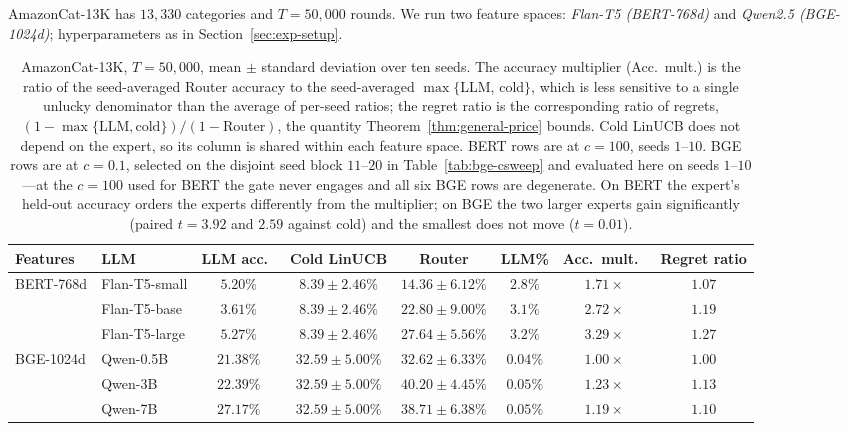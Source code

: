 \documentclass{article}
\theoremstyle{definition}
\theoremstyle{remark}
\theoremstyle{remark}
\begin{document}
AmazonCat-13K has $13{,}330$ categories and $T=50{,}000$ rounds. We run two
feature spaces: \emph{Flan-T5 (BERT-768d)} and \emph{Qwen2.5 (BGE-1024d)};
hyperparameters as in Section~\ref{sec:exp-setup}.

\begin{table}[h]
\centering
\caption{AmazonCat-13K, $T=50{,}000$, mean $\pm$ standard deviation over ten
seeds. The accuracy multiplier (Acc.\ mult.) is the
ratio of the seed-averaged Router accuracy to the seed-averaged $\max\{$LLM,
cold$\}$, which is less sensitive to a single unlucky denominator than the
average of per-seed ratios; the regret ratio is the corresponding ratio of
regrets, $(1-\max\{\text{LLM},\text{cold}\})/(1-\text{Router})$, the quantity
Theorem~\ref{thm:general-price} bounds. Cold LinUCB does not depend on the expert, so its column is
shared within each feature space. BERT rows are at $c=100$, seeds $1$--$10$.
BGE rows are at $c=0.1$, selected on the disjoint seed block $11$--$20$ in
Table~\ref{tab:bge-csweep} and evaluated here on seeds $1$--$10$---at the
$c=100$ used for BERT the gate never engages and all six BGE rows are
degenerate. On BERT the expert's held-out accuracy orders the experts
differently from the multiplier; on BGE the two larger experts gain
significantly (paired $t=3.92$ and $2.59$ against cold) and the smallest does
not move ($t=0.01$).}
\label{tab:amazon-results}
\small
\begin{tabular}{@{}llcccccc@{}}
\toprule
Features & LLM & LLM acc.\ & Cold LinUCB & Router & LLM\% & Acc.\ mult.\ & Regret ratio \\
\midrule
\multirow{3}{*}{BERT-768d} & Flan-T5-small  & $5.20\%$ & $8.39\pm2.46\%$ & $14.36\pm6.12\%$ & $2.8\%$  & $1.71\times$ & $1.07$ \\
& Flan-T5-base  & $3.61\%$ & $8.39\pm2.46\%$ & $22.80\pm9.00\%$ & $3.1\%$  & $2.72\times$ & $1.19$ \\
& Flan-T5-large & $5.27\%$ & $8.39\pm2.46\%$ & $\mathbf{27.64\pm5.56\%}$ & $3.2\%$  & $\mathbf{3.29\times}$ & $\mathbf{1.27}$ \\
\midrule
\multirow{3}{*}{BGE-1024d} & Qwen-0.5B  & $21.38\%$ & $32.59\pm5.00\%$ & $32.62\pm6.33\%$ & $0.04\%$  & $1.00\times$ & $1.00$ \\
& Qwen-3B  & $22.39\%$ & $32.59\pm5.00\%$ & $\mathbf{40.20\pm4.45\%}$ & $0.05\%$  & $\mathbf{1.23\times}$ & $\mathbf{1.13}$ \\
& Qwen-7B  & $27.17\%$ & $32.59\pm5.00\%$ & $38.71\pm6.38\%$ & $0.05\%$  & $1.19\times$ & $1.10$ \\
\bottomrule
\end{tabular}
\end{table}
\end{document}
